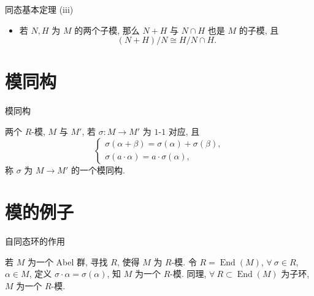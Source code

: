 
\begin{frame}{同态基本定理 (iii)}

\begin{lem}[模的同态基本定理 (续)]
\begin{itemize}
\item[(iii)] 若 $N, H$ 为 $M$ 的两个子模, 那么 $N + H$ 与 $N \cap H$
  也是 $M$ 的子模, 且
  \[
  (N + H)/N \cong H/N \cap H .
  \]
\end{itemize}
\end{lem}

\end{frame}


\section[模同构]{模同构}


\begin{frame}{模同构}

\begin{Def}[模同构]
两个 $R$-模, $M$ 与 $M'$, 若 $\sigma: M \to M'$ 为 $1$-$1$ 对应, 且
\[
\begin{cases}
\sigma(\alpha + \beta) = \sigma(\alpha) + \sigma(\beta), \\
\sigma(a \cdot \alpha) = a \cdot \sigma(\alpha),
\end{cases}
\]
称 $\sigma$ 为 $M \to M'$ 的一个\alert{模同构}.
\end{Def}

\end{frame}


\section[模的例子]{模的例子}


\begin{frame}{自同态环的作用}

\begin{eg}[自同态环]
若 $M$ 为一个 Abel 群, 寻找 $R$, 使得 $M$ 为 $R$-模.
令 $R = \operatorname{End}(M)$, $\forall\ \sigma \in R$, $\alpha \in M$,
定义 $\sigma \cdot \alpha = \sigma(\alpha)$, 知 $M$ 为一个 $R$-模.
同理, $\forall\ R \subset \operatorname{End}(M)$ 为子环,
$M$ 为一个 $R$-模.
\end{eg}

\end{frame}

